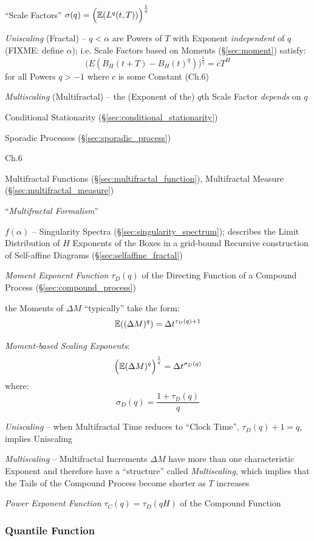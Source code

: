 ``Scale Factors'' $\sigma(q) = \Big(\mathbb{E}(L^q(t, T))\Big)^{\frac{1}{q}}$

\emph{Uniscaling} (Fractal) -- $q < \alpha$ are Powers of $T$ with Exponent
\emph{independent} of $q$ (FIXME: define $\alpha$); i.e. Scale Factors based on
Moments (\S\ref{sec:moment}) satisfy:
\[
  \Big(E(B_H(t + T) - B_H(t)^q)\Big)^{\frac{1}{q}} = c T^H
\]
for all Powers $q > -1$ where $c$ is some Constant (Ch.6)

\emph{Multiscaling} (Multifractal) -- the (Exponent of the) $q$th Scale Factor
\emph{depends} on $q$

\fist Conditional Stationarity (\S\ref{sec:conditional_stationarity})

\fist Sporadic Processes (\S\ref{sec:sporadic_process})

Ch.6

Multifractal Functions (\S\ref{sec:multifractal_function}), Multifractal Measure
(\S\ref{sec:multifractal_measure})

``\emph{Multifractal Formalism}''

$f(\alpha)$ -- Singularity Spectra (\S\ref{sec:singularity_spectrum}); describes
the Limit Distribution of $H$ Exponents of the Boxes in a grid-bound Recursive
construction of Self-affine Diagrams (\S\ref{sec:selfaffine_fractal})

\emph{Moment Exponent Function} $\tau_D(q)$ of the Directing Function of a
Compound Process (\S\ref{sec:compound_process})

the Moments of $\Delta M$ ``typically'' take the form:
\[
  \mathbb{E}((\Delta M)^q) = \Delta t^{\tau_D(q) + 1}
\]

\emph{Moment-based Scaling Exponents}:
\[
  \Big(\mathbb{E}(\Delta M)^q\Big)^\frac{1}{q} = \Delta t^{\sigma_D(q)}
\]
where:
\[
  \sigma_D(q) = \frac{1 + \tau_D(q)}{q}
\]

\emph{Uniscaling} -- when Multifractal Time reduces to ``Clock Time'',
$\tau_D(q) + 1 = q$, implies Uniscaling

\emph{Multiscaling} -- Multifractal Increments $\Delta M$ have more than one
characteristic Exponent and therefore have a ``structure'' called
\emph{Multiscaling}, which implies that the Tails of the Compound Process become
shorter as $T$ increases

\emph{Power Exponent Function} $\tau_C(q) = \tau_D(qH)$ of the Compound Function



\subsubsection{Quantile Function}\label{sec:quantile_function}

